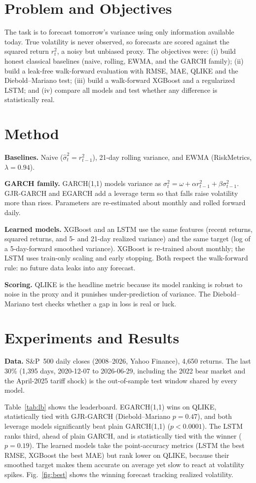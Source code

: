 \documentclass[a4paper,twocolumn,10pt]{article}
\begin{document}
\section{Problem and Objectives}
The task is to forecast tomorrow's variance using only information available today. True volatility is never observed, so forecasts are scored against the squared return $r_t^2$, a noisy but unbiased proxy. The objectives were: (i) build honest classical baselines (naive, rolling, EWMA, and the GARCH family); (ii) build a leak-free walk-forward evaluation with RMSE, MAE, QLIKE and the Diebold–Mariano test; (iii) build a walk-forward XGBoost and a regularized LSTM; and (iv) compare all models and test whether any difference is statistically real.

\section{Method}
\textbf{Baselines.} Naive ($\hat\sigma_t^2=r_{t-1}^2$), 21-day rolling variance, and EWMA (RiskMetrics, $\lambda=0.94$).

\textbf{GARCH family.} GARCH(1,1) models variance as $\sigma_t^2=\omega+\alpha r_{t-1}^2+\beta\sigma_{t-1}^2$. GJR-GARCH and EGARCH add a leverage term so that falls raise volatility more than rises. Parameters are re-estimated about monthly and rolled forward daily.

\textbf{Learned models.} XGBoost and an LSTM use the same features (recent returns, squared returns, and 5- and 21-day realized variance) and the same target (log of a 5-day-forward smoothed variance). XGBoost is re-trained about monthly; the LSTM uses train-only scaling and early stopping. Both respect the walk-forward rule: no future data leaks into any forecast.

\textbf{Scoring.} QLIKE is the headline metric because its model ranking is robust to noise in the proxy and it punishes under-prediction of variance. The Diebold–Mariano test checks whether a gap in loss is real or luck.

\section{Experiments and Results}
\textbf{Data.} S\&P~500 daily closes (2008--2026, Yahoo Finance), 4{,}650 returns. The last 30\% (1{,}395 days, 2020-12-07 to 2026-06-29, including the 2022 bear market and the April-2025 tariff shock) is the out-of-sample test window shared by every model.

Table~\ref{tab:lb} shows the leaderboard. EGARCH(1,1) wins on QLIKE, statistically tied with GJR-GARCH (Diebold–Mariano $p=0.47$), and both leverage models significantly beat plain GARCH(1,1) ($p<0.0001$). The LSTM ranks third, ahead of plain GARCH, and is statistically tied with the winner ($p=0.19$). The learned models take the point-accuracy metrics (LSTM the best RMSE, XGBoost the best MAE) but rank lower on QLIKE, because their smoothed target makes them accurate on average yet slow to react at volatility spikes. Fig.~\ref{fig:best} shows the winning forecast tracking realized volatility.
\end{document}
